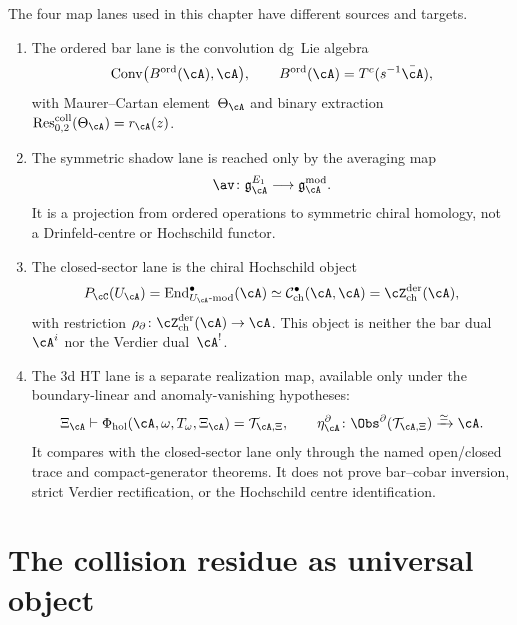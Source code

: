 \begin{remark}
The four map lanes used in this chapter have different sources and
targets.
\begin{enumerate}[label=\textup{(\roman*)}]
\item The ordered bar lane is the convolution dg~Lie algebra
\[
\operatorname{Conv}\bigl(B^{\mathrm{ord}}(\cA),\cA\bigr),
\qquad
B^{\mathrm{ord}}(\cA)=T^c(s^{-1}\bar\cA),
\]
with Maurer--Cartan element~$\Theta_\cA$ and binary extraction
$\operatorname{Res}^{\mathrm{coll}}_{0,2}(\Theta_\cA)=r_\cA(z)$.
\item The symmetric shadow lane is reached only by the averaging map
\[
\av\colon
\mathfrak g^{E_1}_\cA\longrightarrow
\mathfrak g^{\mathrm{mod}}_\cA.
\]
It is a projection from ordered operations to symmetric chiral homology,
not a Drinfeld-centre or Hochschild functor.
\item The closed-sector lane is the chiral Hochschild object
\[
P_\cC(U_\cA)=
\mathrm{End}^{\bullet}_{U_\cA\text{-}\mathrm{mod}}(\cA)
\simeq
\mathcal C^\bullet_{\mathrm{ch}}(\cA,\cA)
=\cZ^{\mathrm{der}}_{\mathrm{ch}}(\cA),
\]
with restriction
$\rho_\partial\colon \cZ^{\mathrm{der}}_{\mathrm{ch}}(\cA)\to\cA$.
This object is neither the bar dual~$\cA^i$ nor the Verdier dual~$\cA^!$.
\item The $3$d HT lane is a separate realization map, available only
under the boundary-linear and anomaly-vanishing hypotheses:
\[
\Xi_\cA\vdash
\Phi_{\mathrm{hol}}(\cA,\omega,T_\omega,\Xi_\cA)
=\mathcal T_{\cA,\Xi},\qquad
\eta^\partial_\cA\colon
\Obs^\partial(\mathcal T_{\cA,\Xi})\xrightarrow{\simeq}\cA.
\]
It compares with the closed-sector lane only through the named
open/closed trace and compact-generator theorems. It does not prove
bar--cobar inversion, strict Verdier rectification, or the Hochschild
centre identification.
\end{enumerate}
\end{remark}

\section{The collision residue as universal object}
\label{sec:hdm-collision-residue}

